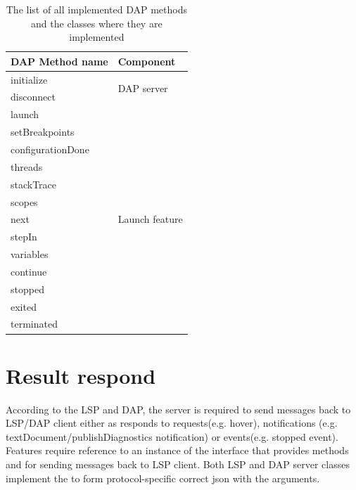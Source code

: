 \begin{table}
	\centering
	\begin{tabular}{ll}
		\toprule
		\textbf{DAP Method name} & \textbf{Component}                 \\ \midrule
		initialize               & \multirow{2}{3cm}{DAP server}      \\
		disconnect               &                                    \\ \midrule
		launch                   & \multirow{13}{3cm}{Launch feature} \\
		setBreakpoints           &                                    \\
		configurationDone        &                                    \\
		threads                  &                                    \\
		stackTrace               &                                    \\
		scopes                   &                                    \\
		next                     &                                    \\
		stepIn                   &                                    \\
		variables                &                                    \\
		continue                 &                                    \\
		stopped                  &                                    \\
		exited                   &                                    \\
		terminated               &                                    \\ \bottomrule
	\end{tabular}
	\caption{The list of all implemented DAP methods and the classes where they are implemented}
	\label{DAP_methods}
\end{table}

\section{Result respond}

According to the LSP and DAP, the server is required to send messages back to LSP/DAP client either as responds to requests(e.g. hover), notifications (e.g. textDocument/publishDiagnostics notification) or events(e.g. stopped event). Features require reference to an instance of the  interface that provides methods  and  for sending messages back to LSP client. Both LSP and DAP server classes implement the  to form protocol-specific correct json with the arguments.

